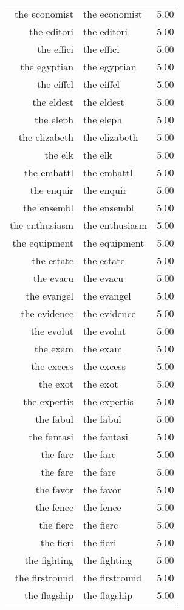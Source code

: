 \begin{table}[ht]
\begin{tabular}{rlr}
  the economist & the economist & 5.00 \\ 
  the editori & the editori & 5.00 \\ 
  the effici & the effici & 5.00 \\ 
  the egyptian & the egyptian & 5.00 \\ 
  the eiffel & the eiffel & 5.00 \\ 
  the eldest & the eldest & 5.00 \\ 
  the eleph & the eleph & 5.00 \\ 
  the elizabeth & the elizabeth & 5.00 \\ 
  the elk & the elk & 5.00 \\ 
  the embattl & the embattl & 5.00 \\ 
  the enquir & the enquir & 5.00 \\ 
  the ensembl & the ensembl & 5.00 \\ 
  the enthusiasm & the enthusiasm & 5.00 \\ 
  the equipment & the equipment & 5.00 \\ 
  the estate & the estate & 5.00 \\ 
  the evacu & the evacu & 5.00 \\ 
  the evangel & the evangel & 5.00 \\ 
  the evidence & the evidence & 5.00 \\ 
  the evolut & the evolut & 5.00 \\ 
  the exam & the exam & 5.00 \\ 
  the excess & the excess & 5.00 \\ 
  the exot & the exot & 5.00 \\ 
  the expertis & the expertis & 5.00 \\ 
  the fabul & the fabul & 5.00 \\ 
  the fantasi & the fantasi & 5.00 \\ 
  the farc & the farc & 5.00 \\ 
  the fare & the fare & 5.00 \\ 
  the favor & the favor & 5.00 \\ 
  the fence & the fence & 5.00 \\ 
  the fierc & the fierc & 5.00 \\ 
  the fieri & the fieri & 5.00 \\ 
  the fighting & the fighting & 5.00 \\ 
  the firstround & the firstround & 5.00 \\ 
  the flagship & the flagship & 5.00 \\ 

\end{tabular}
\end{table}
